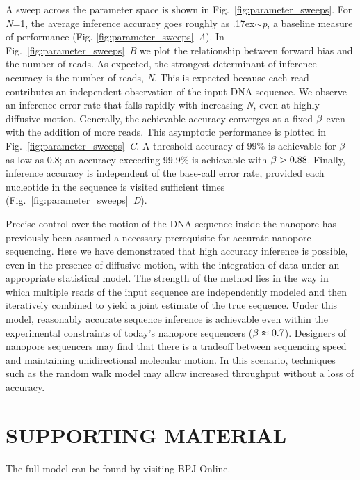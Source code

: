 \documentclass{biophys_letter}
\begin{document}
A sweep across the parameter space is shown in Fig.~\ref{fig:parameter_sweeps}.
For \emph{N}=1, the average inference accuracy goes roughly as {\raise.17ex\hbox{$\scriptstyle\sim$}}\emph{p}, a baseline measure of performance (Fig. \ref{fig:parameter_sweeps}\emph{~A}).
In Fig.~\ref{fig:parameter_sweeps}\emph{~B} we plot the relationship between forward bias and the number of reads.
As expected, the strongest determinant of inference accuracy is the number of reads, \emph{N}.
This is expected because each read contributes an independent observation of the input DNA sequence.
We observe an inference error rate that falls rapidly with increasing \emph{N}, even at highly diffusive motion. 
Generally, the achievable accuracy converges at a fixed $\beta$ even with the addition of more reads.
This asymptotic performance is plotted in Fig.~\ref{fig:parameter_sweeps}\emph{~C}.
A threshold accuracy of 99\% is achievable for $\beta$ as low as 0.8; an accuracy exceeding 99.9\% is achievable with $\beta>0.88$.
Finally, inference accuracy is independent of the base-call error rate, provided each nucleotide in the sequence is visited sufficient times (Fig.~\ref{fig:parameter_sweeps}\emph{~D}).

Precise control over the motion of the DNA sequence inside the nanopore has previously been assumed a necessary prerequisite for accurate nanopore sequencing.
Here we have demonstrated that high accuracy inference is possible, even in the presence of diffusive motion, with the integration of data under an appropriate statistical model. 
The strength of the method lies in the way in which multiple reads of the input sequence are independently modeled and then iteratively combined to yield a joint estimate of the true sequence.
Under this model, reasonably accurate sequence inference is achievable even within the experimental constraints of today's nanopore sequencers ($\beta\approx 0.7$).
Designers of nanopore sequencers may find that there is a tradeoff between sequencing speed and maintaining unidirectional molecular motion.
In this scenario, techniques such as the random walk model may allow increased throughput without a loss of accuracy.

\section*{SUPPORTING MATERIAL}

The full model can be found by visiting BPJ Online.%
\end{document}
